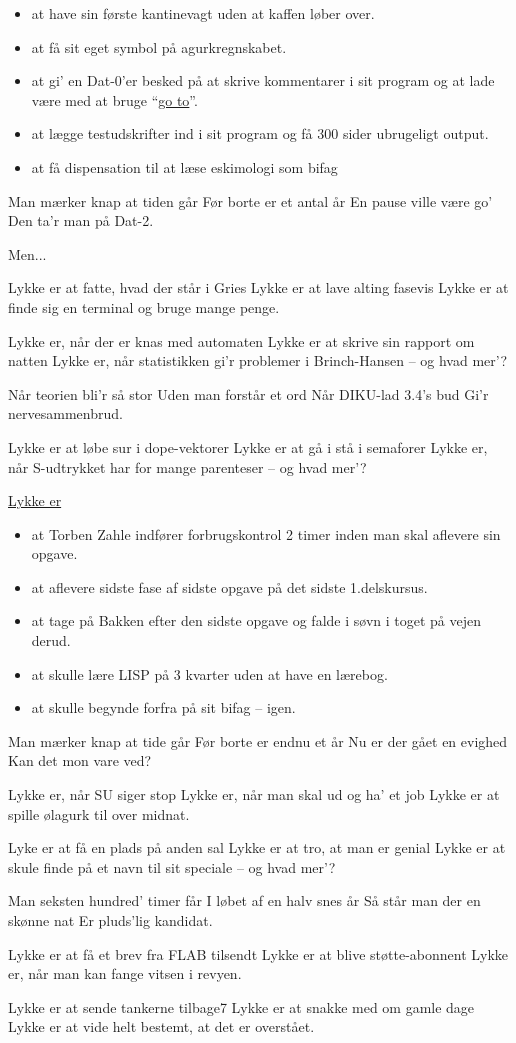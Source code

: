 \documentclass[a4paper,11pt]{article}
\begin{document}
\begin{itemize}
\item at have sin første kantinevagt uden at kaffen løber over.
\item at få sit eget symbol på agurkregnskabet.
\item at gi' en Dat-0'er besked på at skrive kommentarer i sit program og at
  lade være med at bruge ``\underline{go to}''.
\item at lægge testudskrifter ind i sit program og få 300 sider ubrugeligt output.
\item at få dispensation til at læse eskimologi som bifag
\end{itemize}
\begin{song}
Man mærker knap at tiden går
Før borte er et antal år
En pause ville være go'
Den ta'r man på Dat-2.

Men...

Lykke er at fatte, hvad der står i Gries
Lykke er at lave alting fasevis
Lykke er at finde sig en terminal og bruge mange penge.

Lykke er, når der er knas med automaten
Lykke er at skrive sin rapport om natten
Lykke er, når statistikken gi'r problemer i Brinch-Hansen -- og hvad mer'?

Når teorien bli'r så stor
Uden man forstår et ord
Når DIKU-lad 3.4's bud
Gi'r nervesammenbrud.

Lykke er at løbe sur i dope-vektorer
Lykke er at gå i stå i semaforer
Lykke er, når S-udtrykket har for mange parenteser -- og hvad mer'?

\underline{Lykke er}
\end{song}
\begin{itemize}
\item at Torben Zahle indfører forbrugskontrol 2 timer inden man skal aflevere
  sin opgave.
\item at aflevere sidste fase af sidste opgave på det sidste 1.delskursus.
\item at tage på Bakken efter den sidste opgave og falde i søvn i toget på vejen derud.
\item at skulle lære LISP på 3 kvarter uden at have en lærebog.
\item at skulle begynde forfra på sit bifag -- igen.
\end{itemize}
\begin{song}
Man mærker knap at tide går
Før borte er endnu et år
Nu er der gået en evighed
Kan det mon vare ved?

Lykke er, når SU siger stop
Lykke er, når man skal ud og ha' et job
Lykke er at spille ølagurk til over midnat.

Lyke er at få en plads på anden sal
Lykke er at tro, at man er genial
Lykke er at skule finde på et navn til sit speciale -- og hvad mer'?

Man seksten hundred' timer får
I løbet af en halv snes år
Så står man der en skønne nat
Er pluds'lig kandidat.

Lykke er at få et brev fra FLAB tilsendt
Lykke er at blive støtte-abonnent
Lykke er, når man kan fange vitsen i revyen.

Lykke er at sende tankerne tilbage7
Lykke er at snakke med om gamle dage
Lykke er at vide helt bestemt, at det er overstået.
\end{song}
\end{document}
